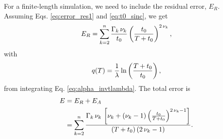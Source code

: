 \documentclass[reprint, floatfix]{revtex4-1}
\newcommand{\note}[1]{{\color{DarkGreen}\footnotesize \textsc{Note.} #1}}
\newcommand{\Err}{E}
\begin{document}
For a finite-length simulation,
we need to include the residual error, $\Err_R$.
%
Assuming Eqs. \eqref{eq:error_res1} and \eqref{eq:t0_sinc},
we get
%
\begin{equation}
\Err_R
=
\sum_{k = 2}^n
  \frac{ \Gamma_k \, \nu_k }
       {        t_0   }
  \left(
      \frac{   t_0   }
           { T + t_0 }
   \right)^{ 2 \, \nu_k },
\notag
\end{equation}
%
with
%
\begin{equation}
  q(T)
  =
  \frac{ 1 } { \lambda }
  \ln\left(
    \frac{ T + t_0 } { t_0 }
  \right)
  ,
\notag
\end{equation}
%
from integrating Eq. \eqref{eq:alpha_invtlambda}.
%
%
The total error is
%
\begin{align}
\Err
&=
\Err_R + \Err_A
\notag
\\
&=
\sum_{ k = 2 }^n
  \frac
  {
    \Gamma_k \, \nu_k \,
    \left[
      \nu_k
      +
      (\nu_k - 1)
      \left(
        \frac{ t_0 } { T + t_0 }
      \right)^{ 2 \, \nu_k - 1 }
    \right]
  }
  {
    (T + t_0) \, (2 \, \nu_k - 1)
  }
  .
\label{eq:error_invt}
\end{align}
%

\end{document}
